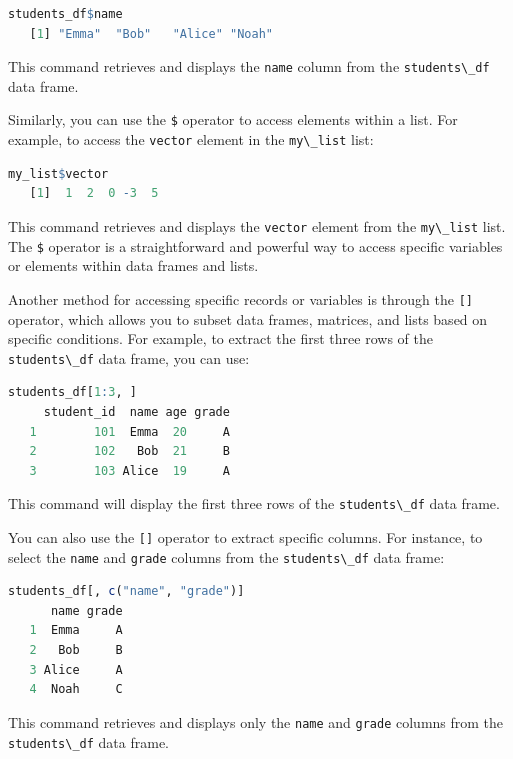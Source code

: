 \documentclass[
  11pt,
]{book}
\newcommand{\passthrough}[1]{#1}
\theoremstyle{definition}
\theoremstyle{definition}
\theoremstyle{definition}
\theoremstyle{definition}
\theoremstyle{remark}
\begin{document}
\begin{lstlisting}[language=R]
students_df$name
   [1] "Emma"  "Bob"   "Alice" "Noah"
\end{lstlisting}

This command retrieves and displays the \passthrough{\lstinline!name!} column from the \passthrough{\lstinline!students\_df!} data frame.

Similarly, you can use the \passthrough{\lstinline!$!} operator to access elements within a list. For example, to access the \passthrough{\lstinline!vector!} element in the \passthrough{\lstinline!my\_list!} list:

\begin{lstlisting}[language=R]
my_list$vector
   [1]  1  2  0 -3  5
\end{lstlisting}

This command retrieves and displays the \passthrough{\lstinline!vector!} element from the \passthrough{\lstinline!my\_list!} list. The \passthrough{\lstinline!$!} operator is a straightforward and powerful way to access specific variables or elements within data frames and lists.

Another method for accessing specific records or variables is through the \passthrough{\lstinline![]!} operator, which allows you to subset data frames, matrices, and lists based on specific conditions. For example, to extract the first three rows of the \passthrough{\lstinline!students\_df!} data frame, you can use:

\begin{lstlisting}[language=R]
students_df[1:3, ]
     student_id  name age grade
   1        101  Emma  20     A
   2        102   Bob  21     B
   3        103 Alice  19     A
\end{lstlisting}

This command will display the first three rows of the \passthrough{\lstinline!students\_df!} data frame.

You can also use the \passthrough{\lstinline![]!} operator to extract specific columns. For instance, to select the \passthrough{\lstinline!name!} and \passthrough{\lstinline!grade!} columns from the \passthrough{\lstinline!students\_df!} data frame:

\begin{lstlisting}[language=R]
students_df[, c("name", "grade")]
      name grade
   1  Emma     A
   2   Bob     B
   3 Alice     A
   4  Noah     C
\end{lstlisting}

This command retrieves and displays only the \passthrough{\lstinline!name!} and \passthrough{\lstinline!grade!} columns from the \passthrough{\lstinline!students\_df!} data frame.
\end{document}
